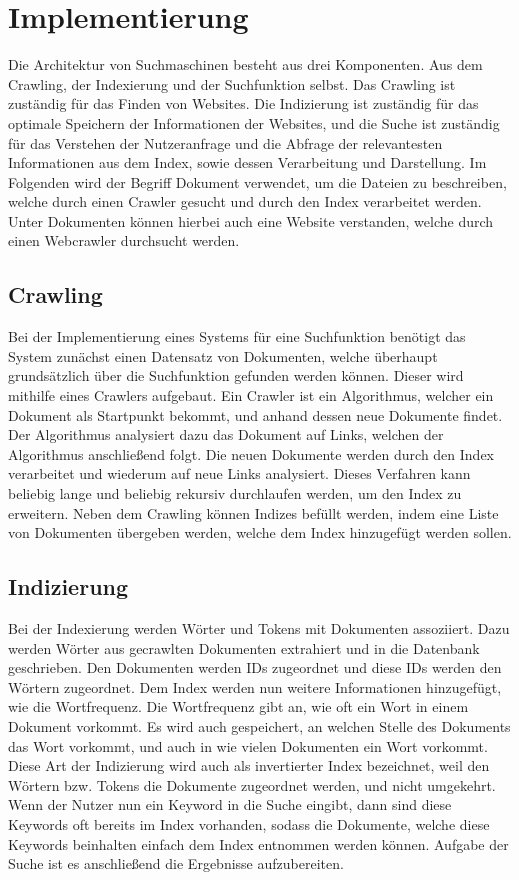 \chapter{Implementierung}

Die Architektur von Suchmaschinen besteht aus drei Komponenten.
Aus dem Crawling, der Indexierung und der Suchfunktion selbst.
Das Crawling ist zuständig für das Finden von Websites.
Die Indizierung ist zuständig für das optimale Speichern der Informationen der Websites, und die Suche ist zuständig für das Verstehen der Nutzeranfrage und die Abfrage der relevantesten Informationen aus dem Index, sowie dessen Verarbeitung und Darstellung.
Im Folgenden wird der Begriff Dokument verwendet, um die Dateien zu beschreiben, welche durch einen Crawler gesucht und durch den Index verarbeitet werden.
Unter Dokumenten können hierbei auch eine Website verstanden, welche durch einen Webcrawler durchsucht werden.

\section{Crawling}
Bei der Implementierung eines Systems für eine Suchfunktion benötigt das System zunächst einen Datensatz von Dokumenten, welche überhaupt grundsätzlich über die Suchfunktion gefunden werden können.
Dieser wird mithilfe eines Crawlers aufgebaut.
Ein Crawler ist ein Algorithmus, welcher ein Dokument als Startpunkt bekommt, und anhand dessen neue Dokumente findet.
Der Algorithmus analysiert dazu das Dokument auf Links, welchen der Algorithmus anschließend folgt.
Die neuen Dokumente werden durch den Index verarbeitet und wiederum auf neue Links analysiert.
Dieses Verfahren kann beliebig lange und beliebig rekursiv durchlaufen werden, um den Index zu erweitern.
Neben dem Crawling können Indizes befüllt werden, indem eine Liste von Dokumenten übergeben werden, welche dem Index hinzugefügt werden sollen.

\section{Indizierung}
Bei der Indexierung werden Wörter und Tokens mit Dokumenten assoziiert.
Dazu werden Wörter aus gecrawlten Dokumenten extrahiert und in die Datenbank geschrieben.
Den Dokumenten werden IDs zugeordnet und diese IDs werden den Wörtern zugeordnet.
Dem Index werden nun weitere Informationen hinzugefügt, wie die Wortfrequenz.
Die Wortfrequenz gibt an, wie oft ein Wort in einem Dokument vorkommt.
Es wird auch gespeichert, an welchen Stelle des Dokuments das Wort vorkommt, und auch in wie vielen Dokumenten ein Wort vorkommt.
Diese Art der Indizierung wird auch als invertierter Index bezeichnet, weil den Wörtern bzw.
Tokens die Dokumente zugeordnet werden, und nicht umgekehrt.
Wenn der Nutzer nun ein Keyword in die Suche eingibt, dann sind diese Keywords oft bereits im Index vorhanden, sodass die Dokumente, welche diese Keywords beinhalten einfach dem Index entnommen werden können.
Aufgabe der Suche ist es anschließend die Ergebnisse aufzubereiten.

